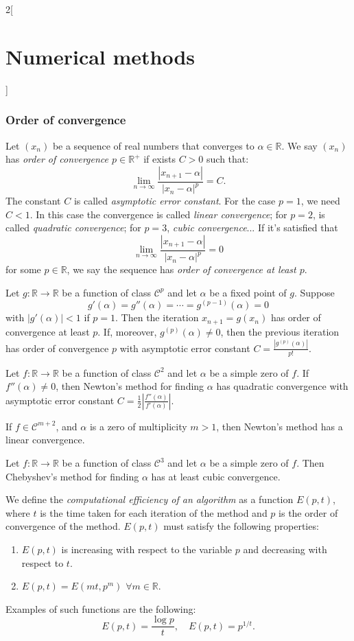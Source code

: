 \documentclass[class=article,10pt,crop=false]{standalone}
\begin{document}
\begin{multicols}{2}[\section{Numerical methods}]
\subsubsection*{Order of convergence}
\begin{definition}
Let $(x_n)$ be a sequence of real numbers that converges to $\alpha\in\mathbb{R}$. We say $(x_n)$ has \textit{order of convergence $p\in\mathbb{R}^+$} if exists $C>0$ such that: $$\lim_{n\to\infty}\frac{|x_{n+1}-\alpha|}{|x_n-\alpha|^p}=C.$$ The constant $C$ is called \textit{asymptotic error constant}. For the case $p=1$, we need $C<1$. In this case the convergence is called \textit{linear convergence}; for $p=2$, is called \textit{quadratic convergence}; for $p=3$, \textit{cubic convergence}... If it's satisfied that $$\lim_{n\to\infty}\frac{|x_{n+1}-\alpha|}{|x_n-\alpha|^p}=0$$ for some $p\in\mathbb{R}$, we say the sequence has \textit{order of convergence at least $p$}.
\end{definition}
\begin{theorem}
Let $g:\mathbb{R}\rightarrow\mathbb{R}$ be a function of class $\mathcal{C}^p$ and let $\alpha$ be a fixed point of $g$. Suppose $$g'(\alpha)=g''(\alpha)=\cdots=g^{(p-1)}(\alpha)=0$$ with $|g'(\alpha)|<1$ if $p=1$. Then the iteration $x_{n+1}=g(x_n)$ has order of convergence at least $p$. If, moreover, $g^{(p)}(\alpha)\ne0$, then the previous iteration has order of convergence $p$ with asymptotic error constant $C=\frac{|g^{(p)}(\alpha)|}{p!}$.
\end{theorem}
\begin{theorem}
Let $f:\mathbb{R}\rightarrow\mathbb{R}$ be a function of class $\mathcal{C}^2$ and let $\alpha$ be a simple zero of $f$. If $f''(\alpha)\ne0$, then Newton's method for finding $\alpha$ has quadratic convergence with asymptotic error constant $C=\frac{1}{2}\left|\frac{f''(\alpha)}{f'(\alpha)}\right|$.\par If $f\in\mathcal{C}^{m+2}$, and $\alpha$ is a zero of multiplicity $m>1$, then Newton's method has a linear convergence.
\end{theorem}
\begin{theorem}
Let $f:\mathbb{R}\rightarrow\mathbb{R}$ be a function of class $\mathcal{C}^3$ and let $\alpha$ be a simple zero of $f$. Then Chebyshev's method for finding $\alpha$ has at least cubic convergence.
\end{theorem}
\begin{definition}
We define the \textit{computational efficiency of an algorithm} as a function $E(p,t)$, where $t$ is the time taken for each iteration of the method and $p$ is the order of convergence of the method. $E(p,t)$ must satisfy the following properties:
\begin{enumerate}
    \item $E(p,t)$ is increasing with respect to the variable $p$ and decreasing with respect to $t$.
    \item $E(p,t)=E(mt,p^m)$ $\forall m\in\mathbb{R}$.
\end{enumerate}
Examples of such functions are the following: $$E(p,t)=\frac{\log p}{t},\quad E(p,t)=p^{1/t}.$$
\end{definition}

\end{multicols}
\end{document}
